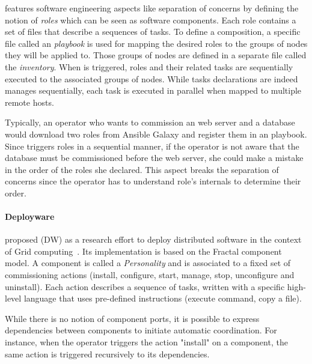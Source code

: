 \ansible features software engineering aspects like separation of concerns by
defining the notion of \emph{roles} which can be seen as software components.
Each role contains a set of files that describe a sequences of tasks. To define
a composition, a specific file called an \ansible \emph{playbook} is used for
mapping the desired roles to the groups of nodes they will be applied to. Those
groups of nodes are defined in a separate file called the \emph{inventory}. When
\ansible is triggered, roles and their related tasks are sequentially executed
to the associated groups of nodes.  While tasks declarations are indeed manages
sequentially, each task is executed in parallel when mapped to multiple remote
hosts.

Typically, an operator who wants to commission an \apache web server and a
\mysql database would download two roles from Ansible Galaxy and register them
in an playbook. Since \ansible triggers roles in a sequential manner, if the
operator is not aware that the database must be commissioned before the web
server, she could make a mistake in the order of the roles she declared. This
aspect breaks the separation of concerns since the operator has to understand
role's internals to determine their order.


\paragraph{Deployware}
\citeauthor{flissi2008ccgrid} proposed \deployware (DW) as a research effort to
deploy distributed software in the context of Grid
computing~\cite{flissi2008ccgrid}. Its implementation is based on the Fractal
component model. A component is called a \emph{Personality} and is associated to
a fixed set of commissioning actions (\ie install, configure, start, manage,
stop, unconfigure and uninstall).  Each action describes a sequence of tasks,
written with a specific high-level language that uses pre-defined instructions
(\eg execute command, copy a file).

While there is no notion of component ports, it is possible to express
dependencies between components to initiate automatic coordination. For
instance, when the operator triggers the action "install" on a component, the
same action is triggered recursively to its dependencies.


